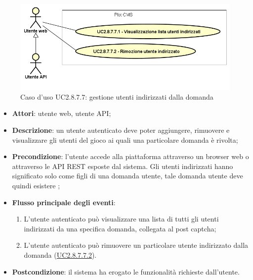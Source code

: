        \begin{figure}
            \centering
            \includegraphics[scale=0.45, width=\textwidth]{immagini/usecase/UC2-8-7-7.png}
            \caption{Caso d'uso UC2.8.7.7: gestione utenti indirizzati dalla domanda}\label{fig:UC2.8.7.7} 
        \end{figure}
\begin{itemize}
\item \textbf{Attori}: utente web, utente API;
\item \textbf{Descrizione}: un utente autenticato deve poter aggiungere, rimuovere e visualizzare gli utenti del gioco ai quali una particolare domanda è rivolta; 
      \item \textbf{Precondizione}: l'utente accede alla piattaforma attraverso un browser web o attraverso le API REST esposte dal sistema. Gli utenti indirizzati hanno significato solo come figli di una domanda utente, tale domanda utente deve quindi esistere ;

        \item \textbf{Flusso principale degli eventi}:
          \begin{enumerate}
          \item L'utente autenticato può visualizzare una lista di tutti gli utenti indirizzati da una specifica domanda, collegata al post captcha;
          \item L'utente autenticato può rimuovere un particolare utente indirizzato dalla domanda (\hyperlink{UC2.8.7.7.2}{UC2.8.7.7.2}).

      \end{enumerate}
    \item \textbf{Postcondizione}: il sistema ha erogato le funzionalità richieste dall'utente.
  \end{itemize}

\hypertarget{UC2.8.7.7.2}{}
